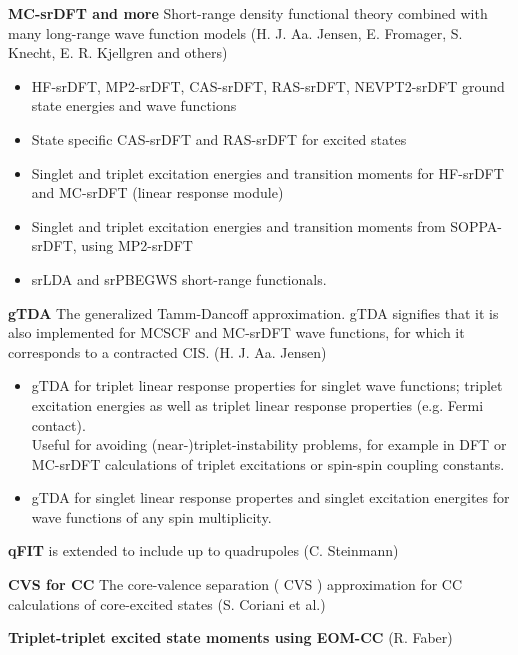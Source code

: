 \begin{description}

\item{\bf MC-srDFT and more} Short-range density functional theory combined with many long-range wave function models
    (H. J. Aa. Jensen, E. Fromager, S. Knecht, E. R. Kjellgren and others)
    \begin{itemize}
  \item HF-srDFT, MP2-srDFT, CAS-srDFT, RAS-srDFT, NEVPT2-srDFT ground state energies and wave functions \\
  \item State specific CAS-srDFT and RAS-srDFT for excited states \\
  \item Singlet and triplet excitation energies and transition moments for HF-srDFT and MC-srDFT (linear response module) \\
  \item Singlet and triplet excitation energies and transition moments from SOPPA-srDFT, using MP2-srDFT \\
  \item srLDA and srPBEGWS short-range functionals.
    \end{itemize}
\item{\bf gTDA} The generalized Tamm-Dancoff approximation.
   gTDA signifies that it is also implemented for MCSCF and MC-srDFT wave functions, for which it corresponds to a contracted CIS. (H. J. Aa. Jensen)
   \begin{itemize}
  \item gTDA for triplet linear response properties for singlet wave functions;
   triplet excitation energies as well as triplet linear response properties (e.g. Fermi contact).\\
   Useful for avoiding (near-)triplet-instability problems, for example in DFT or MC-srDFT calculations of triplet excitations or spin-spin coupling constants.
  \item gTDA for singlet linear response propertes and singlet excitation energites for wave functions of any spin multiplicity.
   \end{itemize}
\item{\bf qFIT} is extended to include up to quadrupoles (C. Steinmann)
\item{\bf CVS for CC} The core-valence separation ( CVS ) approximation for CC calculations of core-excited states (S. Coriani et al.)
\item{\bf Triplet-triplet excited state moments using EOM-CC} (R. Faber)

\end{description}
